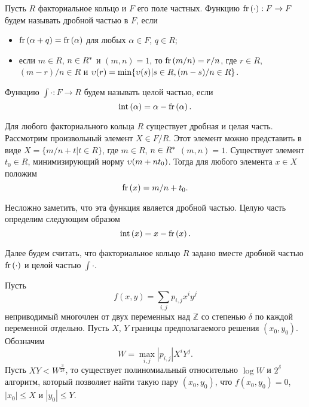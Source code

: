 \documentclass[_00_dissertation.tex]{subfiles}
\begin{document}
\begin{definition}
    Пусть $R$ факториальное кольцо и $F$ его поле частных.
    Функцию $\textrm{fr}\left(\cdot\right): F \to F$ будем называть дробной частью в $F$, если
    \begin{itemize}
        \item $\textrm{fr}\left(\alpha + q\right) = \textrm{fr}\left(\alpha\right)$ для любых $\alpha \in F$, $q \in R$;

        \item если $m \in R$, $n \in R^{*}$ и $(m, n) = 1$, то $\textrm{fr}\left(m/n\right) = r/n$, где $r \in R$, $(m-r)/n \in R$ и $\upsilon(r) = \min \{\upsilon(s) | s \in R, (m-s)/n \in R\}$.
    \end{itemize}
    Функцию $\int{\cdot}: F \to R$ будем называть целой частью, если
    \begin{equation*}
        \textrm{int}\left(\alpha\right) = \alpha - \textrm{fr}\left(\alpha\right).
    \end{equation*}
\end{definition}

\begin{remark}\label{remark:easy_fr}
    Для любого факториального кольца $R$ существует дробная и целая часть.
    Рассмотрим произвольный элемент $X \in F/R$.
    Этот элемент можно представить в виде $X = \{m/n + t | t \in R\}$, где $m \in R$, $n \in R^{*}$ $(m, n) = 1$.
    Существует элемент $t_0 \in R$, минимизирующий норму $\upsilon(m + n t_0)$.
    Тогда для любого элемента $x \in X$ положим
    \begin{equation*}
        \textrm{fr}\left(x\right) = m/n + t_0.
    \end{equation*}

    Несложно заметить, что эта функция является дробной частью.
    Целую часть определим следующим образом
    \begin{equation*}
        \textrm{int}\left(x\right) = x - \textrm{fr}\left(x\right).
    \end{equation*}
\end{remark}

Далее будем считать, что факториальное кольцо $R$ задано вместе дробной частью $\textrm{fr}\left(\cdot\right)$ и целой частью $\int{\cdot}$.

\begin{statement}\label{statement:coppersmith}
  Пусть
  \begin{equation*}
      f(x, y) = \sum\limits_{i, j} p_{i, j} x^i y^j
  \end{equation*}
  неприводимый многочлен от двух переменных над $\mathbb{Z}$ со степенью $\delta$ по каждой переменной отдельно.
  Пусть $X$, $Y$ границы предполагаемого решения $(x_0, y_0)$.
  Обозначим
  \begin{equation*}
      W = \max_{i, j} |p_{i, j}| X^i Y^j.
  \end{equation*}
  Пусть $XY < W^{\frac{3}{2\delta}}$, то существует полиномиальный относительно $\log W$ и $2^\delta$ алгоритм, который позволяет найти такую пару $(x_0, y_0)$, что $f(x_0, y_0) = 0$, $|x_0| \le X$ и $|y_0| \le Y$.
\end{statement}
\end{document}
